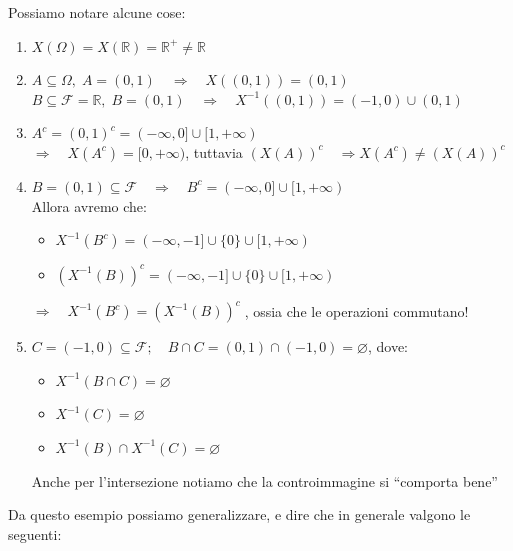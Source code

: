 \begin{esempio}
\begin{figure}[H]
    \end{figure}
    Possiamo notare alcune cose:
    \begin{enumerate}
        \item $X(\Omega) = X(\mathbb{R}) = \mathbb{R}^+\neq\mathbb{R}$
        \item $A\subseteq\Omega, \;A = (0,1)\quad \Rightarrow\quad X((0, 1))= (0, 1)$\\
        $B\subseteq\mathcal{F}=\mathbb{R}, \;B=(0, 1) \quad \Rightarrow\quad X^{-1}((0, 1))= (-1, 0)\cup(0, 1)$
        \item $A^c = (0, 1)^c=(-\infty, 0]\cup[1, +\infty)$\\ $\Rightarrow\quad X(A^c)=[0, +\infty)$, tuttavia $(X(A))^c\quad \Rightarrow X(A^c)\neq (X(A))^c$
        \item $B = (0, 1)\subseteq\mathcal{F}\quad \Rightarrow\quad B^c = (-\infty, 0]\cup[1, +\infty)$\\
        Allora avremo che: 
        \begin{itemize}
            \item \(X^{-1}(B^c) = (-\infty, -1]\cup\{0\}\cup[1, +\infty)\)
            \item \((X^{-1}(B))^c = (-\infty, -1]\cup\{0\}\cup[1, +\infty)\)
        \end{itemize}
        $\Rightarrow\quad X^{-1}(B^c) = (X^{-1}(B))^c\;$, ossia che le operazioni commutano!
        \item $C = (-1, 0)\subseteq\mathcal{F};\quad B\cap C= (0, 1)\cap(-1, 0) = \varnothing$, dove:
        \begin{itemize}
            \item $X^{-1}(B\cap C) = \varnothing$
            \item $X^{-1}(C) = \varnothing$
            \item $X^{-1}(B)\cap X^{-1}(C)  = \varnothing$
        \end{itemize}
        Anche per l'intersezione notiamo che la controimmagine si ``comporta bene''
    \end{enumerate}
\end{esempio}
\noindent Da questo esempio possiamo generalizzare, e dire che in generale valgono le seguenti:
